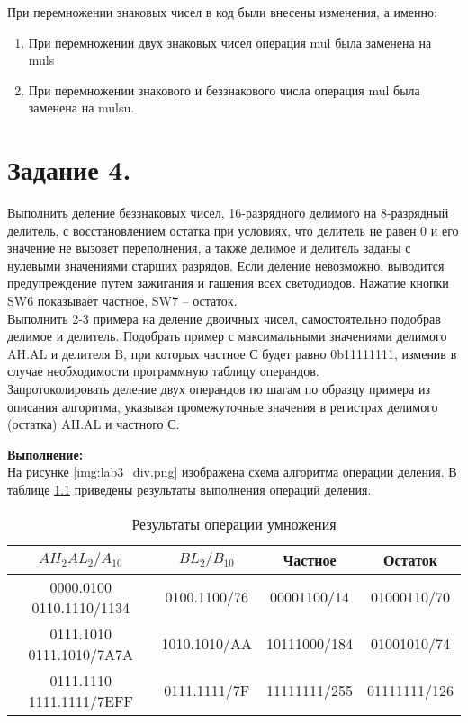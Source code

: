 \documentclass{bmstu}
\begin{document}
При перемножении знаковых чисел в код были внесены изменения, а именно:
\begin{enumerate}
\item При перемножении двух знаковых чисел операция mul была заменена на muls
\item При перемножении знакового и беззнакового числа операция mul была заменена на mulsu.
\end{enumerate}

\chapter{Задание 4.}
Выполнить деление беззнаковых чисел, 16-разрядного делимого на 8-разрядный делитель, с восстановлением остатка при 
условиях, что делитель не равен 0 и его значение не вызовет переполнения, а также делимое и делитель заданы с 
нулевыми значениями старших разрядов. Если деление невозможно, выводится предупреждение путем зажигания и гашения 
всех светодиодов. Нажатие кнопки SW6 показывает частное, SW7 – остаток. \\ 
Выполнить 2-3 примера на деление двоичных чисел, самостоятельно подобрав делимое и делитель. Подобрать пример с 
максимальными значениями делимого AH.AL и делителя B, при которых частное С будет равно 0b11111111, изменив в 
случае необходимости программную таблицу операндов. \\
Запротоколировать деление двух операндов по шагам по образцу примера из описания алгоритма, указывая промежуточные 
значения в регистрах делимого (остатка) AH.AL и частного С.

\textbf{Выполнение:} \\
На рисунке \ref{img:lab3_div.png} изображена схема алгоритма операции деления.
В таблице \ref{table:div_table} приведены результаты выполнения операций деления.

\begin{table}[h]
\caption{Результаты операции умножения}
	\label{table:div_table}
	\begin{tabular}{|c|c|c|c|}
	\hline
		$AH_2 AL_2 / A_{10}$ & $BL_2 / B_{10}$ & Частное & Остаток\\
	\hline
	 	0000.0100 0110.1110/1134 & 0100.1100/76 & 00001100/14 & 01000110/70	\\
	\hline
		0111.1010 0111.1010/7A7A & 1010.1010/AA & 10111000/184 & 01001010/74 \\
	\hline
		0111.1110 1111.1111/7EFF & 0111.1111/7F & 11111111/255 & 01111111/126 \\
	\hline
	
	\end{tabular}
\end{table}
\end{document}
